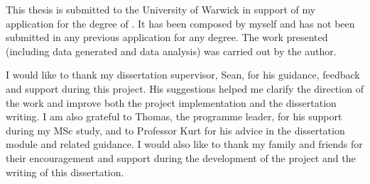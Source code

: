 \frontmatter


\tableofcontents
\clearforchapter\listoffigures
\clearforchapter\listoftables


This thesis is submitted to the University of Warwick in support of my application for the degree of \thequalification. It has been composed by myself and has not been submitted in any previous application for any degree.
The work presented (including data generated and data analysis) was carried out by the author.




I would like to thank my dissertation supervisor, Sean, for his guidance, feedback and support during this project. His suggestions helped me clarify the direction of the work and improve both the project implementation and the dissertation writing. I am also grateful to Thomas, the programme leader, for his support during my MSc study, and to Professor Kurt for his advice in the dissertation module and related guidance. I would also like to thank my family and friends for their encouragement and support during the development of the project and the writing of this dissertation.

